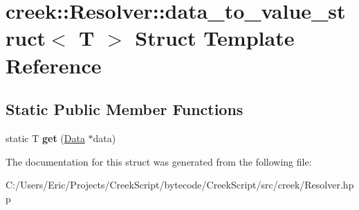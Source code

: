 \hypertarget{structcreek_1_1_resolver_1_1data__to__value__struct}{}\section{creek\+:\+:Resolver\+:\+:data\+\_\+to\+\_\+value\+\_\+struct$<$ T $>$ Struct Template Reference}
\label{structcreek_1_1_resolver_1_1data__to__value__struct}
\subsection*{Static Public Member Functions}
\begin{DoxyCompactItemize}
\item 
static T {\bfseries get} (\hyperlink{classcreek_1_1_data}{Data} $\ast$data)\hypertarget{structcreek_1_1_resolver_1_1data__to__value__struct_a1cab0a627e6c843b4e3cd9e110d99c54}{}\label{structcreek_1_1_resolver_1_1data__to__value__struct_a1cab0a627e6c843b4e3cd9e110d99c54}

\end{DoxyCompactItemize}


The documentation for this struct was generated from the following file\+:\begin{DoxyCompactItemize}
\item 
C\+:/\+Users/\+Eric/\+Projects/\+Creek\+Script/bytecode/\+Creek\+Script/src/creek/Resolver.\+hpp\end{DoxyCompactItemize}
